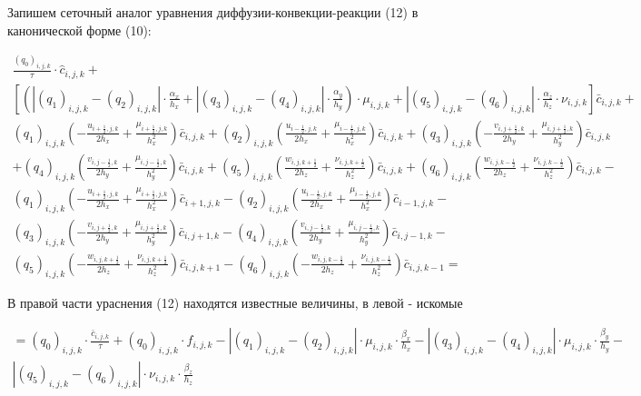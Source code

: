 \documentclass[12pt]{article}
\begin{document}
Запишем сеточный аналог уравнения диффузии-конвекции-реакции (12) в канонической форме (10): 

\begin{multline*}
\frac{(q_0)_{i,j,k}}{\tau}\cdot \hat{c}_{i,j,k} + \\
 \left[ \left( | (q_1)_{i,j,k} - (q_2)_{i,j,k}| \cdot \frac{\alpha_x}{h_x} + | (q_3)_{i,j,k} - (q_4)_{i,j,k}| \cdot \frac{\alpha_y}{h_y} \right) \cdot \mu_{i,j,k} + |(q_5)_{i,j,k} - (q_6)_{i,j,k}| \cdot \frac{\alpha_z}{h_z}\cdot \nu_{i,j,k} \right] \bar{c}_{i,j,k} + \\
(q_1)_{i,j,k} \left( -\frac{u_{i+\frac{1}{2},j,k}}{2h_x}  + \frac{\mu_{i+\frac{1}{2},j,k}}{h_x^2} \right) \bar{c}_{i,j,k} + 
(q_2)_{i,j,k} \left( \frac{u_{i-\frac{1}{2},j,k}}{2h_x}  + \frac{\mu_{i-\frac{1}{2},j,k}}{h_x^2} \right) \bar{c}_{i,j,k} +
(q_3)_{i,j,k} \left( -\frac{v_{i,j+\frac{1}{2},k}}{2h_y}  + \frac{\mu_{i,j+\frac{1}{2},k}}{h_y^2} \right) \bar{c}_{i,j,k} \\
+ (q_4)_{i,j,k} \left( \frac{v_{i,j-\frac{1}{2},k}}{2h_y}  + \frac{\mu_{i,j-\frac{1}{2},k}}{h_y^2} \right) \bar{c}_{i,j,k} +
(q_5)_{i,j,k} \left( \frac{w_{i,j,k+\frac{1}{2}}}{2h_z}  + \frac{\nu_{i,j,k+\frac{1}{2}}}{h_z^2} \right) \bar{c}_{i,j,k} +
(q_6)_{i,j,k} \left( \frac{w_{i,j,k-\frac{1}{2}}}{2h_z}  + \frac{\nu_{i,j,k-\frac{1}{2}}}{h_z^2} \right) \bar{c}_{i,j,k} - \\
(q_1)_{i,j,k} \left( -\frac{u_{i+\frac{1}{2},j,k}}{2h_x}  + \frac{\mu_{i+\frac{1}{2},j,k}}{h_x^2} \right) \bar{c}_{i+1,j,k} -
(q_2)_{i,j,k} \left( \frac{u_{i-\frac{1}{2},j,k}}{2h_x}  + \frac{\mu_{i-\frac{1}{2},j,k}}{h_x^2} \right) \bar{c}_{i-1,j,k} - \\
(q_3)_{i,j,k} \left( -\frac{v_{i,j+\frac{1}{2},k}}{2h_y}  + \frac{\mu_{i,j+\frac{1}{2},k}}{h_y^2} \right) \bar{c}_{i,j+1,k} -
(q_4)_{i,j,k} \left( \frac{v_{i,j-\frac{1}{2},k}}{2h_y}  + \frac{\mu_{i,j-\frac{1}{2},k}}{h_y^2} \right) \bar{c}_{i,j-1,k} - \\
(q_5)_{i,j,k} \left(- \frac{w_{i,j,k+\frac{1}{2}}}{2h_z}  + \frac{\nu_{i,j,k+\frac{1}{2}}}{h_z^2} \right) \bar{c}_{i,j,k+1} -
(q_6)_{i,j,k} \left(- \frac{w_{i,j,k-\frac{1}{2}}}{2h_z}  + \frac{\nu_{i,j,k-\frac{1}{2}}}{h_z^2} \right) \bar{c}_{i,j,k-1} = 
\end{multline*}

В правой части ураснения (12) находятся известные величины, в левой - искомые

\begin{multline}
= (q_0)_{i,j,k} \cdot\frac{\bar c_{i,j,k}}{\tau} + (q_0)_{i,j,k} \cdot f_{i,j,k} - |(q_1)_{i,j,k}-(q_2)_{i,j,k}|\cdot \mu_{i,j,k}\cdot \frac{\beta_x}{h_x} - |(q_3)_{i,j,k}-(q_4)_{i,j,k}|\cdot \mu_{i,j,k}\cdot \frac{\beta_y}{h_y} - \\
|(q_5)_{i,j,k}-(q_6)_{i,j,k}|\cdot \nu_{i,j,k}\cdot \frac{\beta_z}{h_z} 
\end{multline}
\end{document}
